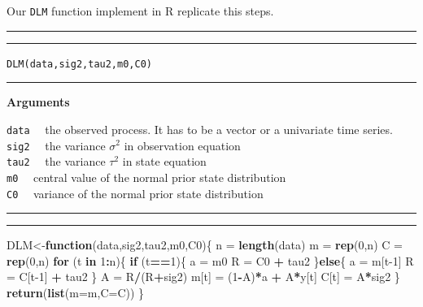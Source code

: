 \documentclass[
]{book}
\newenvironment{Shaded}{\begin{snugshade}}{\end{snugshade}}
\newcommand{\ControlFlowTok}[1]{\textcolor[rgb]{0.13,0.29,0.53}{\textbf{#1}}}
\newcommand{\DataTypeTok}[1]{\textcolor[rgb]{0.13,0.29,0.53}{#1}}
\newcommand{\DecValTok}[1]{\textcolor[rgb]{0.00,0.00,0.81}{#1}}
\newcommand{\KeywordTok}[1]{\textcolor[rgb]{0.13,0.29,0.53}{\textbf{#1}}}
\newcommand{\NormalTok}[1]{#1}
\newcommand{\OperatorTok}[1]{\textcolor[rgb]{0.81,0.36,0.00}{\textbf{#1}}}
\newcommand{\StringTok}[1]{\textcolor[rgb]{0.31,0.60,0.02}{#1}}
\theoremstyle{break}
\theoremstyle{nonumberplain}
\begin{document}
Our \texttt{DLM} function implement in R replicate this steps.\\

\hrule
\hrule

\texttt{DLM(data,sig2,tau2,m0,C0)}\\

\hrule

\textbf{Arguments}

\texttt{data} ~~the observed process. It has to be a vector or a
univariate time series.\\
\texttt{sig2} ~~the variance \(\sigma^{2}\) in observation equation\\
\texttt{tau2} ~~the variance \(\tau^{2}\) in state equation\\
\texttt{m0} ~~central value of the normal prior state distribution\\
\texttt{C0} ~~variance of the normal prior state distribution

\hrule
\hrule

\begin{Shaded}
\begin{Highlighting}[]
\NormalTok{DLM<-}\ControlFlowTok{function}\NormalTok{(data,sig2,tau2,m0,C0)\{}
\NormalTok{  n  =}\StringTok{ }\KeywordTok{length}\NormalTok{(data)}
\NormalTok{  m  =}\StringTok{ }\KeywordTok{rep}\NormalTok{(}\DecValTok{0}\NormalTok{,n)}
\NormalTok{  C  =}\StringTok{ }\KeywordTok{rep}\NormalTok{(}\DecValTok{0}\NormalTok{,n)}
  \ControlFlowTok{for}\NormalTok{ (t }\ControlFlowTok{in} \DecValTok{1}\OperatorTok{:}\NormalTok{n)\{}
    \ControlFlowTok{if}\NormalTok{ (t}\OperatorTok{==}\DecValTok{1}\NormalTok{)\{}
\NormalTok{      a =}\StringTok{ }\NormalTok{m0}
\NormalTok{      R =}\StringTok{ }\NormalTok{C0 }\OperatorTok{+}\StringTok{ }\NormalTok{tau2}
\NormalTok{    \}}\ControlFlowTok{else}\NormalTok{\{}
\NormalTok{      a =}\StringTok{ }\NormalTok{m[t}\DecValTok{-1}\NormalTok{]}
\NormalTok{      R =}\StringTok{ }\NormalTok{C[t}\DecValTok{-1}\NormalTok{] }\OperatorTok{+}\StringTok{ }\NormalTok{tau2}
\NormalTok{    \}}
\NormalTok{    A =}\StringTok{ }\NormalTok{R}\OperatorTok{/}\NormalTok{(R}\OperatorTok{+}\NormalTok{sig2)}
\NormalTok{    m[t] =}\StringTok{ }\NormalTok{(}\DecValTok{1}\OperatorTok{-}\NormalTok{A)}\OperatorTok{*}\NormalTok{a }\OperatorTok{+}\StringTok{ }\NormalTok{A}\OperatorTok{*}\NormalTok{y[t]}
\NormalTok{    C[t] =}\StringTok{ }\NormalTok{A}\OperatorTok{*}\NormalTok{sig2}
\NormalTok{  \}}
  \KeywordTok{return}\NormalTok{(}\KeywordTok{list}\NormalTok{(}\DataTypeTok{m=}\NormalTok{m,}\DataTypeTok{C=}\NormalTok{C))}
\NormalTok{\}}
\end{Highlighting}
\end{Shaded}
\end{document}
